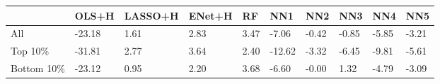 \begin{tabularx}{\linewidth}{*{10}{X}}
& OLS+H& LASSO+H& ENet+H& RF& NN1& NN2& NN3& NN4& NN5\\
\hline
All& -23.18& 1.61& 2.83& 3.47& -7.06& -0.42& -0.85& -5.85& -3.21\\
\hline
Top 10\%& -31.81& 2.77& 3.64& 2.40& -12.62& -3.32& -6.45& -9.81& -5.61\\
\hline
Bottom 10\%& -23.12& 0.95& 2.20& 3.68& -6.60& -0.00& 1.32& -4.79& -3.09\\
\hline
\end{tabularx}